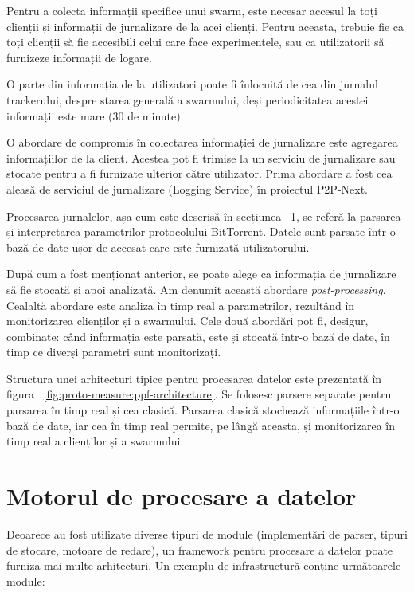 Pentru a colecta informații specifice unui swarm, este necesar accesul la
toți clienții și informații de jurnalizare de la acei clienți. Pentru aceasta,
trebuie fie ca toți clienții să fie accesibili celui care face experimentele,
sau ca utilizatorii să furnizeze informații de logare.

O parte din informația de la utilizatori poate fi înlocuită de cea din jurnalul
trackerului, despre starea generală a swarmului, deși periodicitatea acestei informații este mare (30 de minute).

O abordare de compromis în colectarea informației de jurnalizare este agregarea
informațiilor de la client. Acestea pot fi trimise la un serviciu de
jurnalizare sau stocate pentru a fi furnizate ulterior către utilizator.
Prima abordare a fost cea aleasă de serviciul de jurnalizare (Logging Service)
în proiectul P2P-Next.

Procesarea jurnalelor, așa cum este descrisă în secțiunea
~\ref{sec:proto-measure:data-processing}, se referă la parsarea și interpretarea
parametrilor protocolului BitTorrent. Datele sunt parsate într-o bază de date
ușor de accesat care este furnizată utilizatorului.

După cum a fost menționat anterior, se poate alege ca informația de jurnalizare
să fie stocată și apoi analizată. Am denumit această abordare 
\textit{post-processing}. Cealaltă abordare este analiza în timp real a
parametrilor, rezultând în monitorizarea clienților și a swarmului. Cele două
abordări pot fi, desigur, combinate: când informația este parsată, este
și stocată într-o bază de date, în timp ce diverși parametri sunt monitorizați.

Structura unei arhitecturi tipice pentru procesarea datelor este prezentată
în figura ~\ref{fig:proto-measure:ppf-architecture}. Se folosesc parsere
separate pentru parsarea în timp real și cea clasică. Parsarea clasică
stochează informațiile într-o bază de date, iar cea în timp real permite,
pe lângă aceasta, și monitorizarea în timp real a clienților și a swarmului.

\section{Motorul de procesare a datelor}
\label{sec:proto-measure:data-processing}

Deoarece au fost utilizate diverse tipuri de module (implementări de parser,
tipuri de stocare, motoare de redare), un framework pentru procesare a datelor
poate furniza mai multe arhitecturi. Un exemplu de infrastructură conține
următoarele module:

